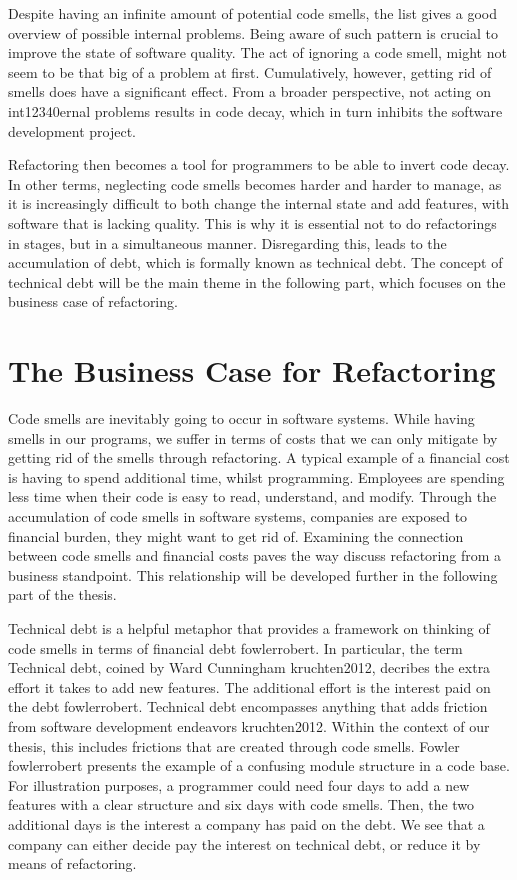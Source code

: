 Despite having an infinite amount of potential code smells,
	the list gives a good overview of possible internal problems.
Being aware of such pattern is crucial
	to improve the state of software quality.
The act of ignoring a code smell, 
	might not seem to be that big of a problem at first. 
Cumulatively, however, 
	getting rid of smells does have a significant effect.
From a broader perspective, not acting on int12340ernal problems results in
	code decay, which in turn inhibits the software development project. 

Refactoring then becomes a tool for programmers to be able to invert code decay.
In other terms, 
	neglecting code smells becomes harder and harder to manage, 
	as it is increasingly difficult to both change the internal state and 
	add features, with software that is lacking quality. 
This is why it is essential not to do refactorings in stages, 
	but in a simultaneous manner.
Disregarding this, 
	leads to the accumulation of debt, 
	which is formally known as technical debt. 
The concept of technical debt will be the main theme 
	in the following part, 
	which focuses on the business case of refactoring.



\section{The Business Case for Refactoring}
\label{sec:Business}
Code smells are inevitably going to occur in software systems. 
While having smells in our programs,
	we suffer in terms of costs that we can only mitigate 
	by getting rid of the smells through refactoring. 
A typical example of a financial cost is 
	having to spend additional time, whilst programming. 
Employees are spending less time 
	when their code is easy to read, understand, and modify.
Through the accumulation of code smells in software systems, companies are exposed to financial burden, they might want to get rid of.
Examining the connection between code smells and financial costs 
	paves the way discuss refactoring from a business standpoint.
This relationship will be developed further in the following part of the thesis.  

Technical debt is a helpful metaphor 
	that provides a framework on thinking of code smells 
	in terms of financial debt {fowlerrobert}.
In particular, the term Technical debt, coined by Ward Cunningham {kruchten2012}, decribes the extra effort it takes to add new features. 
The additional effort is the interest paid on the debt {fowlerrobert}. 
Technical debt encompasses anything 
	that adds friction from software development endeavors {kruchten2012}. 
Within the context of our thesis,
	this includes frictions that are created through code smells. 
Fowler {fowlerrobert} presents the example 
	of a confusing module structure in a code base.
For illustration purposes, 
	a programmer could need four days to add a new features 
	with a clear structure and six days with code smells. 
Then, the two additional days is the interest a company has paid on the debt.
We see that a company can either decide pay the interest on technical debt, 
	or reduce it by means of refactoring. 

